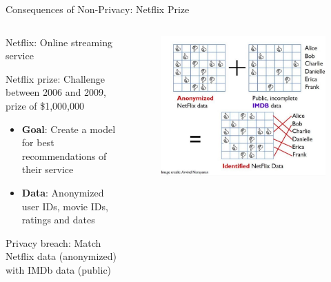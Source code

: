 \documentclass[12pt,aspectratio=169]{beamer}
\begin{document}
\begin{frame}{Consequences of Non-Privacy: Netflix Prize}

  \begin{columns}[T]
    \begin{column}{.5\textwidth}
Netflix: Online streaming service

Netflix prize: Challenge between 2006 and 2009, prize of \$1,000,000

\begin{itemize}
    \item \textbf{Goal}: Create a model for best recommendations of their service
    \item \textbf{Data}: Anonymized user IDs, movie IDs, ratings and dates
\end{itemize}

Privacy breach: Match Netflix data (anonymized) with IMDb data (public)

    \end{column}
    \begin{column}{.5\textwidth}
\begin{figure}
    \centering
    \includegraphics[width=\linewidth]{figures/netflix_prize.jpg}
\end{figure}
    \end{column}
  \end{columns}

\end{frame}
\end{document}

